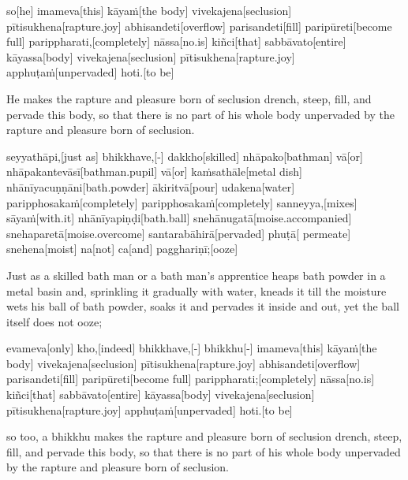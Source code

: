 \begin{samepage}
\begingl[glneveryline={\PaliGlossA,\PaliGlossB}]
so[he] imameva[this] kāyaṁ[the body] vivekajena[seclusion] pītisukhena[rapture.joy] abhisandeti[overflow] parisandeti[fill] paripūreti[become full] parippharati,[completely] nāssa[no.is] kiñci[that] sabbāvato[entire] kāyassa[body] vivekajena[seclusion] pītisukhena[rapture.joy] apphuṭaṁ[unpervaded] hoti.[to be]
\endgl
\nopagebreak
\linespread{0.5}
\begin{spacin}{0.2}
{\PaliGlossFT He makes the rapture and pleasure born of seclusion drench, steep, fill, and pervade this body, so that there is no part of his whole body unpervaded by the rapture and pleasure born of seclusion.}
\end{spacin}
\vskip 12pt
\end{samepage}
\begin{samepage}
\begingl[glneveryline={\PaliGlossA,\PaliGlossB}]
seyyathāpi,[just as] bhikkhave,[-] dakkho[skilled] nhāpako[bathman] vā[or] nhāpakantevāsī[bathman.pupil] vā[or] kaṁsathāle[metal dish] nhānīyacuṇṇāni[bath.powder] ākiritvā[pour] udakena[water] paripphosakaṁ[completely] paripphosakaṁ[completely] sanneyya,[mixes] sāyaṁ[with.it] nhānīyapiṇḍi[bath.ball] snehānugatā[moise.accompanied] snehaparetā[moise.overcome] santarabāhirā[pervaded] phuṭā[ permeate] snehena[moist] na[not] ca[and] pagghariṇī;[ooze]
\endgl
\nopagebreak
\linespread{0.5}
\begin{spacin}{0.2}
{\PaliGlossFT Just as a skilled bath man or a bath man’s apprentice  heaps bath powder in a metal basin and, sprinkling it gradually with water, kneads it till the moisture wets his ball of bath powder, soaks it and pervades it inside and out, yet the ball itself does not ooze;}
\end{spacin}
\vskip 12pt
\end{samepage}
\begin{samepage}
\begingl[glneveryline={\PaliGlossA,\PaliGlossB}]
evameva[only] kho,[indeed] bhikkhave,[-] bhikkhu[-] imameva[this] kāyaṁ[the body] vivekajena[seclusion] pītisukhena[rapture.joy] abhisandeti[overflow] parisandeti[fill] paripūreti[become full] parippharati;[completely] nāssa[no.is] kiñci[that] sabbāvato[entire] kāyassa[body] vivekajena[seclusion] pītisukhena[rapture.joy] apphuṭaṁ[unpervaded] hoti.[to be]
\endgl
\nopagebreak
\linespread{0.5}
\begin{spacin}{0.2}
{\PaliGlossFT so too, a bhikkhu makes the rapture and pleasure born of seclusion  drench, steep, fill, and pervade this body, so that there is no part of his whole body unpervaded by the rapture and pleasure born of seclusion.}
\end{spacin}
\vskip 12pt
\end{samepage}
